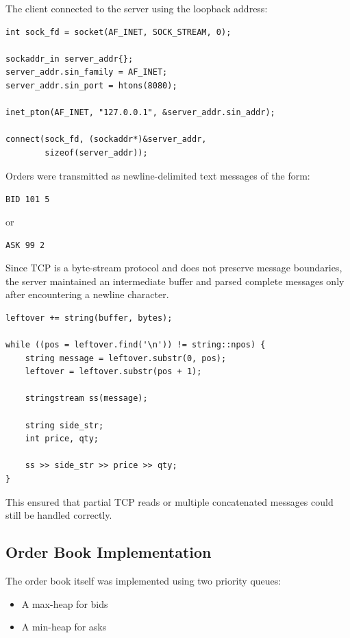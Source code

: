 \documentclass{article}
\begin{document}
The client connected to the server using the loopback address:

\begin{lstlisting}[caption={Client Connection Setup}]
int sock_fd = socket(AF_INET, SOCK_STREAM, 0);

sockaddr_in server_addr{};
server_addr.sin_family = AF_INET;
server_addr.sin_port = htons(8080);

inet_pton(AF_INET, "127.0.0.1", &server_addr.sin_addr);

connect(sock_fd, (sockaddr*)&server_addr,
        sizeof(server_addr));
\end{lstlisting}

Orders were transmitted as newline-delimited text messages of the form:

\begin{center}
\texttt{BID 101 5}
\end{center}

or

\begin{center}
\texttt{ASK 99 2}
\end{center}

Since TCP is a byte-stream protocol and does not preserve message boundaries, the server maintained an intermediate buffer and parsed complete messages only after encountering a newline character.

\begin{lstlisting}[caption={Message Parsing Logic}]
leftover += string(buffer, bytes);

while ((pos = leftover.find('\n')) != string::npos) {
    string message = leftover.substr(0, pos);
    leftover = leftover.substr(pos + 1);

    stringstream ss(message);

    string side_str;
    int price, qty;

    ss >> side_str >> price >> qty;
}
\end{lstlisting}

This ensured that partial TCP reads or multiple concatenated messages could still be handled correctly.

\subsection{Order Book Implementation}

The order book itself was implemented using two priority queues:

\begin{itemize}
    \item A max-heap for bids
    \item A min-heap for asks
\end{itemize}
\end{document}
